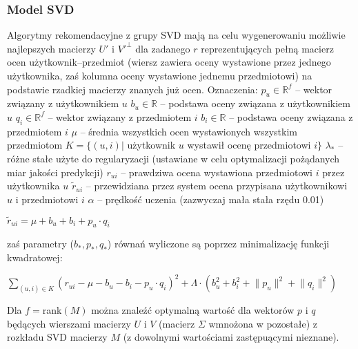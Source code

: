 \documentclass{pracamgr}
\begin{document}
    \subsubsection{Model SVD}
     Algorytmy rekomendacyjne z grupy SVD mają na celu wygenerowaniu możliwie
     najlepszych macierzy $U'$ i $V'^\bot$ dla zadanego $r$ reprezentujących pełną macierz ocen użytkownik--przedmiot
     (wiersz zawiera oceny wystawione przez jednego użytkownika, zaś kolumna oceny wystawione jednemu przedmiotowi)
     na podstawie rzadkiej macierzy znanych już ocen.\newline
     Oznaczenia:\newline
     $p_u\in\mathbb{R}^f$ -- wektor związany z użytkownikiem $u$\newline
     $b_u\in\mathbb{R}$ -- podstawa oceny związana z użytkownikiem $u$\newline
     $q_i\in\mathbb{R}^f$ -- wektor związany z przedmiotem $i$\newline
     $b_i\in\mathbb{R}$ -- podstawa oceny związana z przedmiotem $i$\newline
     $\mu$ -- średnia wszystkich ocen wystawionych wszystkim przedmiotom\newline
     $K=\{(u,i)|$ użytkownik $u$ wystawił ocenę przedmiotowi $i\}$\newline
     $\lambda_{*}$ -- różne stałe użyte do regularyzacji (ustawiane w celu optymalizacji pożądanych miar jakości predykcji)\newline 
     $r_{ui}$ -- prawdziwa ocena wystawiona przedmiotowi $i$ przez użytkownika $u$\newline
     $\tilde{r}_{ui}$ -- przewidziana przez system ocena przypisana użytkownikowi $u$ i przedmiotowi $i$\newline
     $\alpha$ -- prędkość uczenia (zazwyczaj mała stała rzędu 0.01)\newline
     \begin{center}
     $\tilde{r}_{ui}=\mu+b_u+b_i+p_u\cdot q_i$
     \end{center}
     zaś parametry ($b_*,p_*,q_*$) równań wyliczone są poprzez minimalizację funkcji kwadratowej:
     \begin{center}
     $\sum\limits_{(u,i)\in K}(r_{ui}-\mu-b_u-b_i-p_u\cdot q_i)^2+\Lambda\cdot(b_u^2+b_i^2+\lVert p_u\rVert^2+\lVert q_i\rVert^2)$
     \end{center}
     Dla $f=$rank$(M)$ można znaleźć optymalną wartość dla wektorów $p$ i $q$ będących wierszami macierzy $U$ i $V$
     (macierz $\Sigma$ wmnożona w pozostałe) z rozkładu SVD macierzy $M$ (z dowolnymi wartościami zastępuącymi nieznane).
\end{document}
